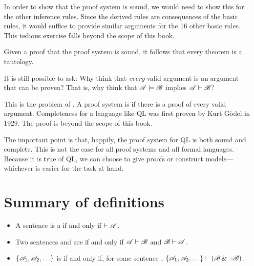 In order to show that the proof system is sound, we would need to show this for the other inference rules. Since the derived rules are consequences of the basic rules, it would suffice to provide similar arguments for the 16 other basic rules. This tedious exercise falls beyond the scope of this book.

Given a proof that the proof system is sound, it follows that every theorem is a tautology.

It is still possible to ask: Why think that \emph{every} valid argument is an argument that can be proven?  That is, why think that $\mathscr{A}\models\mathscr{B}$ implies $\mathscr{A}\vdash\mathscr{B}$?

This is the problem of . A proof system is  if there is a proof of every valid argument. Completeness for a language like QL was first proven by Kurt G\"odel in 1929. The proof is beyond the scope of this book.

The important point is that, happily, the proof system for QL is both sound and complete. This is not the case for all proof systems and all formal languages. Because it is true of QL, we can choose to give proofs or construct models--- whichever is easier for the task at hand.




\section*{Summary of definitions}
\begin{itemize}
\item A sentence  is a  if and only if $\vdash\mathscr{A}$.

\item Two sentences  and  are  if and only if $\mathscr{A}\vdash\mathscr{B}$ and $\mathscr{B}\vdash\mathscr{A}$.

\item $\{\mathscr{A}_1,\mathscr{A}_2,\ldots\}$ is  if and only if, for some sentence , $\{\mathscr{A}_1,\mathscr{A}_2,\ldots\}\vdash(\mathscr{B} \,\&\, \neg \mathscr{B})$.
\end{itemize}


\practiceproblems

